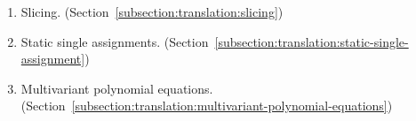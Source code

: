 
\begin{enumerate}
\item Slicing. (Section~\ref{subsection:translation:slicing})
\item Static single
  assignments. (Section~\ref{subsection:translation:static-single-assignment})
\item Multivariant polynomial
  equations. (Section~\ref{subsection:translation:multivariant-polynomial-equations})
\end{enumerate}


